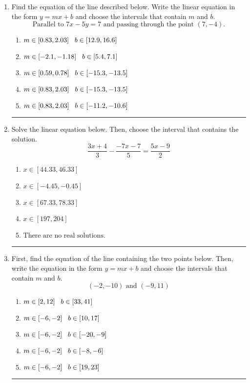 \documentclass[14pt]{extbook}
\newcommand{\litem}[1]{\item#1\hspace*{-1cm}\rule{\textwidth}{0.4pt}}
\begin{document}
\begin{enumerate}
{\begin{enumerate}[label=\Alph*.]
\end{enumerate} }
\litem{
Find the equation of the line described below. Write the linear equation in the form $ y=mx+b $ and choose the intervals that contain $m$ and $b$.\[ \text{Parallel to } 7 x - 5 y = 7 \text{ and passing through the point } (7, -4). \]\begin{enumerate}[label=\Alph*.]
\item \( m \in [0.83, 2.03] \hspace*{3mm} b \in [12.9, 16.6] \)
\item \( m \in [-2.1, -1.18] \hspace*{3mm} b \in [5.4, 7.1] \)
\item \( m \in [0.59, 0.78] \hspace*{3mm} b \in [-15.3, -13.5] \)
\item \( m \in [0.83, 2.03] \hspace*{3mm} b \in [-15.3, -13.5] \)
\item \( m \in [0.83, 2.03] \hspace*{3mm} b \in [-11.2, -10.6] \)

\end{enumerate} }
\litem{
Solve the linear equation below. Then, choose the interval that contains the solution.\[ \frac{3x + 4}{3} - \frac{-7x -7}{5} = \frac{5x -9}{2} \]\begin{enumerate}[label=\Alph*.]
\item \( x \in [44.33, 46.33] \)
\item \( x \in [-4.45, -0.45] \)
\item \( x \in [67.33, 78.33] \)
\item \( x \in [197, 204] \)
\item \( \text{There are no real solutions.} \)

\end{enumerate} }
\litem{
First, find the equation of the line containing the two points below. Then, write the equation in the form $ y=mx+b $ and choose the intervals that contain $m$ and $b$.\[ (-2, -10) \text{ and } (-9, 11) \]\begin{enumerate}[label=\Alph*.]
\item \( m \in [2, 12] \hspace*{3mm} b \in [33, 41] \)
\item \( m \in [-6, -2] \hspace*{3mm} b \in [10, 17] \)
\item \( m \in [-6, -2] \hspace*{3mm} b \in [-20, -9] \)
\item \( m \in [-6, -2] \hspace*{3mm} b \in [-8, -6] \)
\item \( m \in [-6, -2] \hspace*{3mm} b \in [19, 23] \)


\end{enumerate}}
\end{enumerate}
\end{document}

